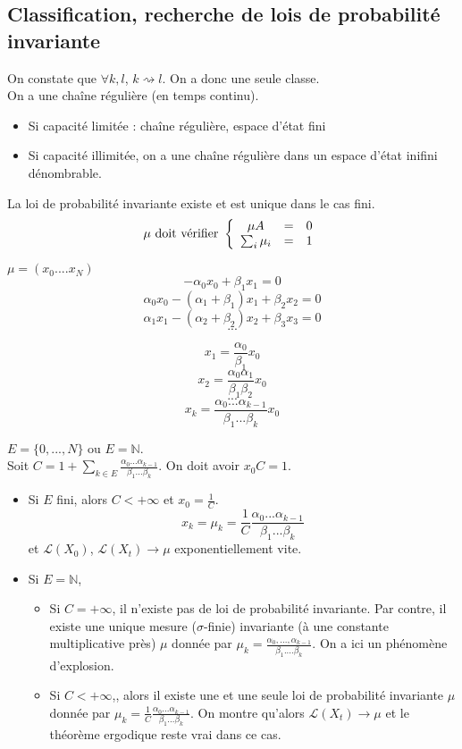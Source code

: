 \subsection{Classification, recherche de lois de probabilité invariante}
On constate que $\forall k,l$, $k\rightsquigarrow l$. On a donc une seule classe.\\
On a une chaîne régulière (en temps continu). 
\begin{itemize}
	\item Si capacité limitée : chaîne régulière, espace d'état fini
	\item Si capacité illimitée, on a une chaîne régulière dans un espace d'état inifini dénombrable.
\end{itemize}

La loi de probabilité invariante existe et est unique dans le cas fini.
	\[\mu \text{ doit vérifier } \left\{ \begin{array}{c c c} \mu A&=&0 \\ \sum_i \mu_i &=& 1 \end{array} \right.\]

$\mu=(x_0....x_N)$
	\[-\alpha_0x_0+\beta_1x_1=0\]
	\[\alpha_0x_0-(\alpha_1+\beta_1)x_1+\beta_2x_2=0\]
	\[\alpha_1x_1-(\alpha_2+\beta_2)x_2+\beta_3x_3=0\]
	\[...\]

	\[x_1=\frac{\alpha_0}{\beta_1}x_0\]
	\[x_2=\frac{\alpha_0\alpha_1}{\beta_1\beta_2}x_0\]
	\[...\]
	\[x_k=\frac{\alpha_0...\alpha_{k-1}}{\beta_1...\beta_k}x_0\]

$E=\{0,...,N\}$ ou $E=\mathbb{N}$.\\
Soit $C=1+\sum_{k\in E} \frac{\alpha_0...\alpha_{k-1}}{\beta_1...\beta_k}$. On doit avoir $x_0 C=1$.\\

\begin{itemize}
	\item Si $E$ fini, alors $C<+\infty$ et $x_0=\frac{1}{C}$.
	\[x_k=\mu_k=\frac{1}{C}\frac{\alpha_0...\alpha_{k-1}}{\beta_1...\beta_k}\]
et $\mathcal{L}(X_0)$, $\mathcal{L}(X_t)\to \mu$ exponentiellement vite.

	\item Si $E=\mathbb{N}$, \begin{itemize}
		\item Si $C=+\infty$, il n'existe pas de loi de probabilité invariante. Par contre, il existe une unique mesure ($\sigma$-finie) invariante (à une constante multiplicative près) $\mu$ donnée par $\mu_k=\frac{\alpha_0,...,\alpha_{k-1}}{\beta_1....\beta_k}$. On a ici un phénomène d'explosion.
		\item Si $C<+\infty$,, alors il existe une et une seule loi de probabilité invariante $\mu$ donnée par $\mu_k=\frac{1}{C}\frac{\alpha_0...\alpha_{k-1}}{\beta_1...\beta_k}$. On montre qu'alors $\mathcal{L}(X_t)\to \mu$ et le théorème ergodique reste vrai dans ce cas.
	\end{itemize}
\end{itemize}

